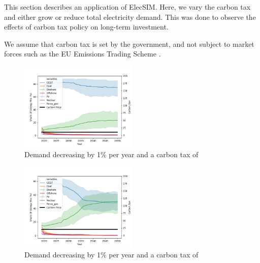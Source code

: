 
This section describes an application of ElecSIM. Here, we vary the carbon tax and either grow or reduce total electricity demand. This was done to observe the effects of carbon tax policy on long-term investment.

We assume that carbon tax is set by the government, and not subject to market forces such as the EU Emissions Trading Scheme \cite{Council2016}.



\begin{figure}[h]
	\begin{center}
		\includegraphics[width=0.5\textwidth]{figures/scenarios/demand099-carbon10-datetime.png}
		\caption{Demand decreasing by 1\% per year and a carbon tax of }
		\label{fig:demand99carbon10}
	\end{center}
\end{figure}

\begin{figure}[h]
	\begin{center}
		\includegraphics[width=0.5\textwidth]{figures/scenarios/demand099-carbon20-datetime.png}
		\caption{Demand decreasing by 1\% per year and a carbon tax of }
		\label{fig:demand99carbon10}
	\end{center}
\end{figure}



